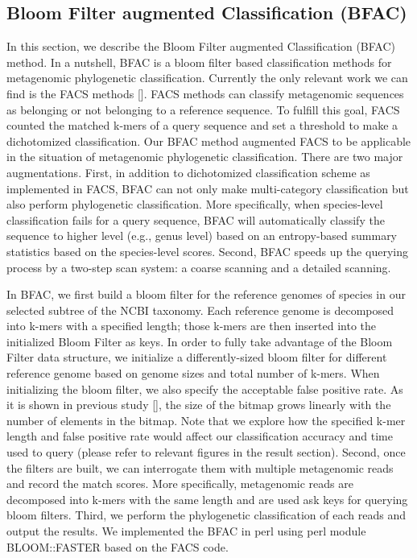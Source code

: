 \documentclass[12pt]{article} %
\begin{document}
\subsection{Bloom Filter augmented Classification (BFAC)}
In this section, we describe the Bloom Filter augmented Classification (BFAC) method. In a nutshell, BFAC is a bloom filter based classification methods for metagenomic phylogenetic classification. Currently the only relevant work we can find is the FACS methods [\cite{Stranneheim:2010dg}]. FACS methods can classify metagenomic sequences as belonging or not belonging to a reference sequence. To fulfill this goal, FACS counted the matched k-mers of a query sequence and set a threshold to make a dichotomized classification. Our BFAC method augmented FACS to be applicable in the situation of metagenomic phylogenetic classification. There are two major augmentations. First, in addition to dichotomized classification scheme as implemented in FACS, BFAC can not only make multi-category classification but also perform phylogenetic classification. More specifically, when species-level classification fails for a query sequence, BFAC will automatically classify the sequence to higher level (e.g., genus level) based on an entropy-based summary statistics based on the species-level scores. Second, BFAC speeds up the querying process by a two-step scan system: a coarse scanning and a detailed scanning. 
\par
In BFAC, we first build a bloom filter for the reference genomes of species in our selected subtree of the NCBI taxonomy. Each reference genome is decomposed into k-mers with a specified length; those k-mers are then inserted into the initialized Bloom Filter as keys. In order to fully take advantage of the Bloom Filter data structure, we initialize a differently-sized bloom filter for different reference genome based on genome sizes and total number of k-mers. When initializing the bloom filter, we also specify the acceptable false positive rate. As it is shown in previous study [\cite{Broder:2004dg}], the size of the bitmap grows linearly with the number of elements in the bitmap. Note that we explore how the specified k-mer length and false positive rate would affect our classification accuracy and time used to query (please refer to relevant figures in the result section). Second, once the filters are built, we can interrogate them with multiple metagenomic reads and record the match scores. More specifically, metagenomic reads are decomposed into k-mers with the same length and are used ask keys for querying bloom filters. Third, we perform the phylogenetic classification of each reads and output the results. We implemented the BFAC in perl using perl module BLOOM::FASTER based on the FACS code. 
\end{document}
